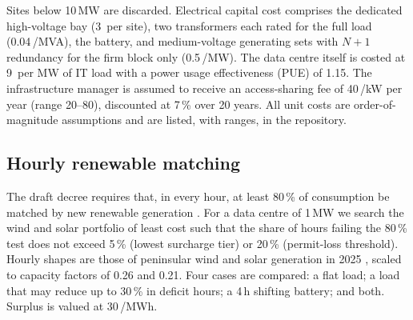 Sites below 10\,MW are discarded. Electrical capital cost comprises the dedicated high-voltage bay (3\,\MEUR{} per site), two transformers each rated for the full load (0.04\,\MEUR/MVA), the battery, and medium-voltage generating sets with $N{+}1$ redundancy for the firm block only (0.5\,\MEUR/MW). The data centre itself is costed at 9\,\MEUR{} per MW of IT load with a power usage effectiveness (PUE) of 1.15. The infrastructure manager is assumed to receive an access-sharing fee of 40\,\texteuro/kW per year (range 20--80), discounted at 7\,\% over 20 years. All unit costs are order-of-magnitude assumptions and are listed, with ranges, in the repository.

\subsection{Hourly renewable matching}

The draft decree requires that, in every hour, at least 80\,\% of consumption be matched by new renewable generation \cite{prd2026}. For a data centre of 1\,MW we search the wind and solar portfolio of least cost such that the share of hours failing the 80\,\% test does not exceed 5\,\% (lowest surcharge tier) or 20\,\% (permit-loss threshold). Hourly shapes are those of peninsular wind and solar generation in 2025 \cite{ree2025horario}, scaled to capacity factors of 0.26 and 0.21. Four cases are compared: a flat load; a load that may reduce up to 30\,\% in deficit hours; a 4\,h shifting battery; and both. Surplus is valued at 30\,\texteuro/MWh.

